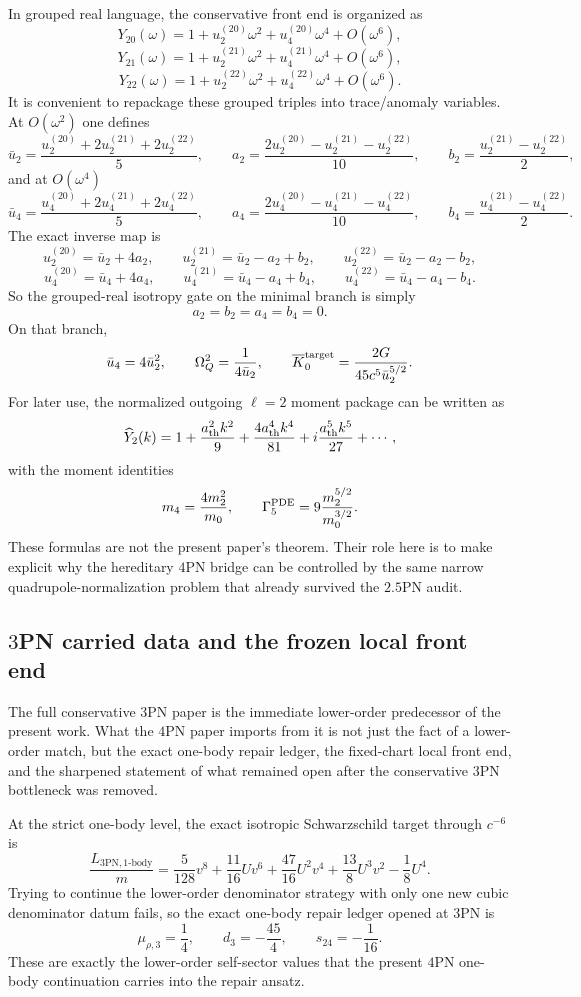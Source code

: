 \documentclass[11pt]{article}
\begin{document}
In grouped real language, the conservative front end is organized as
\[
Y_{20}(\omega)=1+u_2^{(20)}\omega^2+u_4^{(20)}\omega^4+O(\omega^6),
\]
\[
Y_{21}(\omega)=1+u_2^{(21)}\omega^2+u_4^{(21)}\omega^4+O(\omega^6),
\]
\[
Y_{22}(\omega)=1+u_2^{(22)}\omega^2+u_4^{(22)}\omega^4+O(\omega^6).
\]
It is convenient to repackage these grouped triples into trace/anomaly
 variables.  At $O(\omega^2)$ one defines
\[
\bar u_2=\frac{u_2^{(20)}+2u_2^{(21)}+2u_2^{(22)}}{5},
\qquad
a_2=\frac{2u_2^{(20)}-u_2^{(21)}-u_2^{(22)}}{10},
\qquad
b_2=\frac{u_2^{(21)}-u_2^{(22)}}{2},
\]
and at $O(\omega^4)$
\[
\bar u_4=\frac{u_4^{(20)}+2u_4^{(21)}+2u_4^{(22)}}{5},
\qquad
a_4=\frac{2u_4^{(20)}-u_4^{(21)}-u_4^{(22)}}{10},
\qquad
b_4=\frac{u_4^{(21)}-u_4^{(22)}}{2}.
\]
The exact inverse map is
\[
u_2^{(20)}=\bar u_2+4a_2,
\qquad
u_2^{(21)}=\bar u_2-a_2+b_2,
\qquad
u_2^{(22)}=\bar u_2-a_2-b_2,
\]
\[
u_4^{(20)}=\bar u_4+4a_4,
\qquad
u_4^{(21)}=\bar u_4-a_4+b_4,
\qquad
u_4^{(22)}=\bar u_4-a_4-b_4.
\]
So the grouped-real isotropy gate on the minimal branch is simply
\[
a_2=b_2=a_4=b_4=0.
\]
On that branch,
\[
\bar u_4=4\bar u_2^2,
\qquad
\Omega_Q^2=\frac{1}{4\bar u_2},
\qquad
\overline K_0^{\rm target}=\frac{2G}{45c^5\bar u_2^{5/2}}.
\]
For later use, the normalized outgoing $\ell=2$ moment package can be written as
\[
\widehat Y_2(k)=1+\frac{a_{\rm th}^2k^2}{9}+\frac{4a_{\rm th}^4k^4}{81}+i\frac{a_{\rm th}^5k^5}{27}+\cdots,
\]
with the moment identities
\[
m_4=\frac{4m_2^2}{m_0},
\qquad
\Gamma_5^{\rm PDE}=9\frac{m_2^{5/2}}{m_0^{3/2}}.
\]
These formulas are not the present paper's theorem.  Their role here is to make
 explicit why the hereditary $4$PN bridge can be controlled by the same narrow
 quadrupole-normalization problem that already survived the $2.5$PN audit.

\subsection{\texorpdfstring{$3$}{3}PN carried data and the frozen local front end}
\label{app:carry-forward-3pn}

The full conservative $3$PN paper is the immediate lower-order predecessor of
 the present work.  What the $4$PN paper imports from it is not just the fact of
 a lower-order match, but the exact one-body repair ledger, the fixed-chart
 local front end, and the sharpened statement of what remained open after the
 conservative $3$PN bottleneck was removed.

At the strict one-body level, the exact isotropic Schwarzschild target through
 $c^{-6}$ is
\[
\frac{L_{3\mathrm{PN},1\text{-body}}}{m}
=
\frac5{128}v^8
+\frac{11}{16}Uv^6
+\frac{47}{16}U^2v^4
+\frac{13}{8}U^3v^2
-\frac18U^4.
\]
Trying to continue the lower-order denominator strategy with only one new cubic
 denominator datum fails, so the exact one-body repair ledger opened at $3$PN is
\[
\mu_{\rho,3}=\frac14,
\qquad
 d_3=-\frac{45}{4},
\qquad
 s_{24}=-\frac1{16}.
\]
These are exactly the lower-order self-sector values that the present $4$PN
 one-body continuation carries into the repair ansatz.
\end{document}
